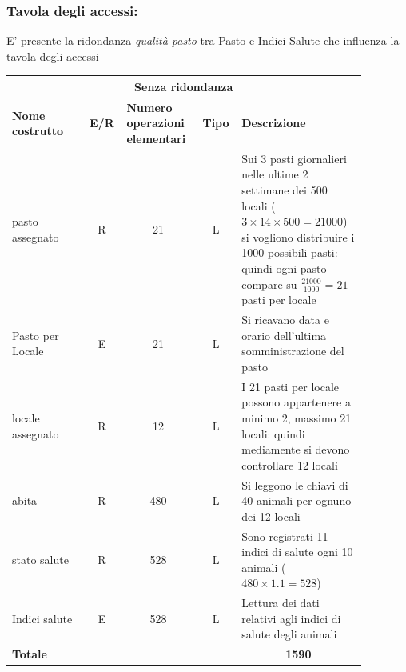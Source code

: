 \documentclass[12pt,a4paper]{article}
\begin{document}
\subsubsection*{Tavola degli accessi:}

E' presente la ridondanza \textit{qualità pasto} tra Pasto e Indici Salute che influenza la tavola degli accessi

\begin{center}\setlength{\extrarowheight}{1.5pt}\begin{longtable}{|p{0.2\linewidth}|p{0.1\linewidth}|p{0.175\linewidth}|p{0.1\linewidth}|p{0.3\linewidth}|}
\hline
\multicolumn{5}{|c|}{Senza ridondanza}
\\
\hline \textbf{Nome costrutto}   & \multicolumn{1}{|c|}{\textbf{E/R}} & \textbf{Numero operazioni elementari} & \multicolumn{1}{|c|}{\textbf{Tipo}} & \textbf{Descrizione}\\ 
\hline
pasto assegnato
 & 
\multicolumn{1}{|c|}{R}
 & 
\multicolumn{1}{|c|}{21}
 & 
\multicolumn{1}{|c|}{L}
 & 
Sui 3 pasti giornalieri nelle ultime 2 settimane dei 500 locali ($3\times 14 \times 500= 21000$) si vogliono distribuire i 1000 possibili pasti: quindi ogni pasto compare su $\frac{21000}{1000}=21$ pasti per locale
\\
\hline
Pasto per Locale
 & 
\multicolumn{1}{|c|}{E}
 & 
\multicolumn{1}{|c|}{21}
 & 
\multicolumn{1}{|c|}{L}
 & 
Si ricavano data e orario dell'ultima somministrazione del pasto
\\
\hline
locale assegnato
 & 
\multicolumn{1}{|c|}{R}
 & 
\multicolumn{1}{|c|}{12}
 & 
\multicolumn{1}{|c|}{L}
 & 
I 21 pasti per locale possono appartenere a minimo 2, massimo 21 locali: quindi mediamente si devono controllare 12 locali
\\
\hline
abita
 & 
\multicolumn{1}{|c|}{R}
 & 
\multicolumn{1}{|c|}{480}
 & 
\multicolumn{1}{|c|}{L}
 & 
Si leggono le chiavi di 40 animali per ognuno dei 12 locali
\\
\hline
stato salute
 & 
\multicolumn{1}{|c|}{R}
 & 
\multicolumn{1}{|c|}{528}
 & 
\multicolumn{1}{|c|}{L}
 & 
Sono registrati 11 indici di salute ogni 10 animali ($480\times 1.1 = 528$)
\\
\hline
Indici salute
 & 
\multicolumn{1}{|c|}{E}
 & 
\multicolumn{1}{|c|}{528}
 & 
\multicolumn{1}{|c|}{L}
 & 
Lettura dei dati relativi agli indici di salute degli animali
\\
\hline
\multicolumn{4}{|l|}{\textbf{Totale}}
 & 
\multicolumn{1}{|c|}{\textbf{1590}}
\\
\hline
\end{longtable}\end{center}
\end{document}
